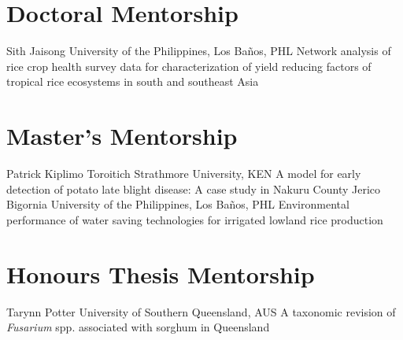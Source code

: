 \section*{Doctoral Mentorship}
\begin{entrylist}
    {Sith Jaisong {}}
    {University of the Philippines, Los Ba\~nos, PHL}
    {Network analysis of rice crop health survey data for characterization of yield reducing factors of tropical rice ecosystems in south and southeast Asia}
\end{entrylist}

\section*{Master's Mentorship}
\begin{entrylist}
    {Patrick Kiplimo Toroitich {}}
    {Strathmore University, KEN}
    {A model for early detection of potato late blight disease: A case study in Nakuru County}
    {Jerico Bigornia {}}
    {University of the Philippines, Los Ba\~nos, PHL}
    {Environmental performance of water saving technologies for irrigated lowland rice production}
\end{entrylist}

\section*{Honours Thesis Mentorship}
\begin{entrylist}
    {Tarynn Potter {}}
    {University of Southern Queensland, AUS}
    {A taxonomic revision of \textit{Fusarium} spp. associated with sorghum in Queensland}
\end{entrylist}
